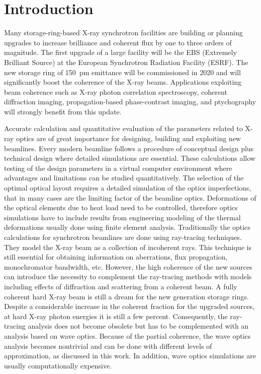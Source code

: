 \documentclass{iucr}              %
\begin{document}
\section{Introduction}

Many storage-ring-based X-ray synchrotron facilities are building or planning upgrades to increase brilliance and coherent flux by one to three orders of magnitude.  The first upgrade of a large facility will be the EBS (Extremely Brilliant Source) \cite{orangebook} at the European Synchrotron Radiation Facility (ESRF). The new storage ring of 150~pm emittance will be commissioned in 2020 and will significantly boost the coherence of the X-ray beams. Applications exploiting beam coherence such as X-ray photon correlation spectroscopy, coherent diffraction imaging, propagation-based phase-contrast imaging, and ptychography will strongly benefit from this update.  

Accurate calculation and quantitative evaluation of the parameters related to X-ray optics are of great importance for designing, building and exploiting new beamlines. Every modern beamline follows a procedure of conceptual design plus technical design where detailed simulations are essential. These calculations allow testing of the design parameters in a virtual computer environment where advantages and limitations can be studied quantitatively. The selection of the optimal optical layout requires a detailed simulation of the optics imperfections, that in many cases are the limiting factor of the beamline optics. Deformations of the optical elements due to heat load need to be controlled, therefore optics simulations have to include results from engineering modeling of the thermal deformations usually done using finite element analysis. Traditionally the optics calculations for synchrotron beamlines are done using ray-tracing techniques. They model the X-ray beam as a collection of incoherent rays. This technique is still essential for obtaining information on aberrations, flux propagation, monochromator bandwidth, etc. However, the high coherence of the new sources can introduce the necessity to complement the ray-tracing methods with models including effects of diffraction and scattering from a coherent beam. A fully coherent hard X-ray beam is still a dream for the new generation storage rings. Despite a considerable increase in the coherent fraction for the upgraded sources, at hard X-ray photon energies it is still a few percent. Consequently, the ray-tracing analysis does not become obsolete but has to be complemented with an analysis based on wave optics. Because of the partial coherence, the wave optics analysis becomes nontrivial and can be done with different levels of approximation, as discussed in this work. In addition, wave optics simulations are usually computationally expensive.
\end{document}
